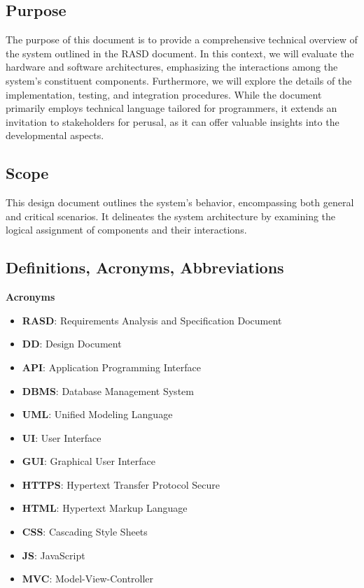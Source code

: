 \documentclass[../DD.tex]{subfiles}
\begin{document}
    \subsection{Purpose}\label{subsec:purpose}
    The purpose of this document is to provide a comprehensive technical overview of the system outlined in the RASD document. 
    In this context, we will evaluate the hardware and software architectures, emphasizing the interactions among the system's constituent components. 
    Furthermore, we will explore the details of the implementation, testing, and integration procedures. 
    While the document primarily employs technical language tailored for programmers, it extends an invitation to stakeholders for perusal, as it can offer valuable insights into the developmental aspects.

    \subsection{Scope}\label{subsec:scope}
    This design document outlines the system's behavior, encompassing both general and critical scenarios. 
    It delineates the system architecture by examining the logical assignment of components and their interactions.

    \subsection{Definitions, Acronyms, Abbreviations}\label{subsec:definitions_acronyms_abbreviations}
    \textbf{Acronyms}
    \begin{itemize}
        \item \textbf{RASD}: Requirements Analysis and Specification Document
        \item \textbf{DD}: Design Document
        \item \textbf{API}: Application Programming Interface
        \item \textbf{DBMS}: Database Management System
        \item \textbf{UML}: Unified Modeling Language
        \item \textbf{UI}: User Interface
        \item \textbf{GUI}: Graphical User Interface
        \item \textbf{HTTPS}: Hypertext Transfer Protocol Secure
        \item \textbf{HTML}: Hypertext Markup Language
        \item \textbf{CSS}: Cascading Style Sheets
        \item \textbf{JS}: JavaScript
        \item \textbf{MVC}: Model-View-Controller
    \end{itemize}
\end{document}
